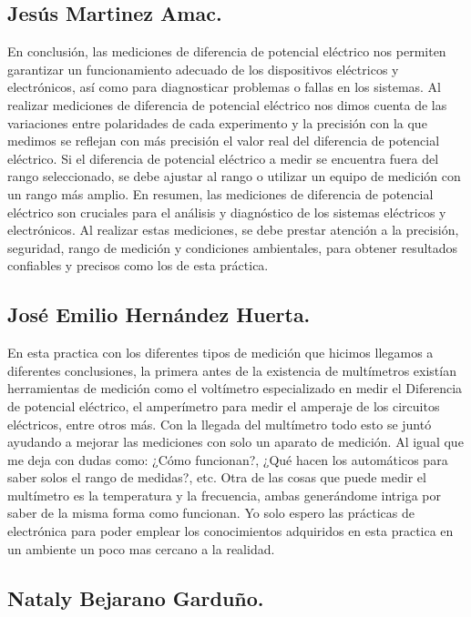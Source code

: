 \documentclass[10pt]{article}
\begin{document}
\begin{multicols}{2}
\subsection*{Jesús Martinez Amac.}
En conclusión, las mediciones de diferencia de potencial eléctrico nos permiten garantizar un funcionamiento adecuado de los dispositivos eléctricos y electrónicos, así como para diagnosticar problemas o fallas en los sistemas.
Al realizar mediciones de diferencia de potencial eléctrico nos dimos cuenta de las variaciones entre polaridades de cada experimento y la precisión con la que medimos se reflejan con más precisión el valor real del diferencia de potencial eléctrico.
 Si el diferencia de potencial eléctrico a medir se encuentra fuera del rango seleccionado, se debe ajustar al rango o utilizar un equipo de medición con un rango más amplio.
En resumen, las mediciones de diferencia de potencial eléctrico son cruciales para el análisis y diagnóstico de los sistemas eléctricos y electrónicos. Al realizar estas mediciones, se debe prestar atención a la precisión, seguridad, rango de medición y condiciones ambientales, para obtener resultados confiables y precisos como los de esta práctica.
\subsection*{José Emilio Hernández Huerta.}
En esta practica con los diferentes tipos de medición que hicimos llegamos a diferentes conclusiones, la primera antes de la existencia de multímetros existían herramientas de medición como el voltímetro especializado en medir el Diferencia de potencial eléctrico, el amperímetro para medir el amperaje de los circuitos eléctricos, entre otros más. Con la llegada del multímetro todo esto se juntó ayudando a mejorar las mediciones con solo un aparato de medición. Al igual que me deja con dudas como: ¿Cómo funcionan?, ¿Qué hacen los automáticos para saber solos el rango de medidas?, etc. Otra de las cosas que puede medir el multímetro es la temperatura y la frecuencia, ambas generándome intriga por saber de la misma forma como funcionan. Yo solo espero las prácticas de electrónica para poder emplear los conocimientos adquiridos en esta practica en un ambiente un poco mas cercano a la realidad. 
\subsection*{Nataly Bejarano Garduño.}


\end{multicols}
\end{document}
